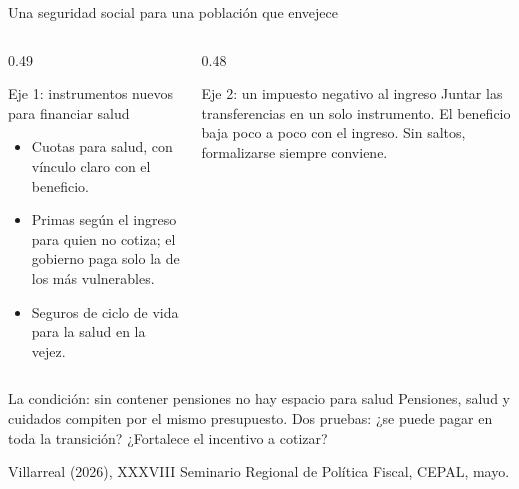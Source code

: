 \documentclass[aspectratio=169,11pt]{beamer}
\newcommand{\fuente}[1]{\par\vfill{\small\color{cGris}#1\par}}
\begin{document}
\begin{frame}{Una seguridad social para una población que envejece}
  \begin{columns}[T]
    \begin{column}{0.49\textwidth}
      \begin{block}{Eje 1: instrumentos nuevos para financiar salud}
        \begin{itemize}
          \item Cuotas para salud, con vínculo claro con el beneficio.
          \item Primas según el ingreso para quien no cotiza; el gobierno paga solo la de los más vulnerables.
          \item Seguros de ciclo de vida para la salud en la vejez.
        \end{itemize}
      \end{block}
    \end{column}
    \begin{column}{0.48\textwidth}
      \pause
      \begin{block}{Eje 2: un impuesto negativo al ingreso}
        Juntar las transferencias en un solo instrumento. El beneficio baja poco a poco con el ingreso. Sin saltos, formalizarse siempre conviene.
      \end{block}
    \end{column}
  \end{columns}
  \pause
  \begin{alertblock}{La condición: sin contener pensiones no hay espacio para salud}
    Pensiones, salud y cuidados compiten por el mismo presupuesto. Dos pruebas: ¿se puede pagar en toda la transición? ¿Fortalece el incentivo a cotizar?
  \end{alertblock}
  \fuente{Villarreal (2026), XXXVIII Seminario Regional de Política Fiscal, CEPAL, mayo.}
\end{frame}
\end{document}
